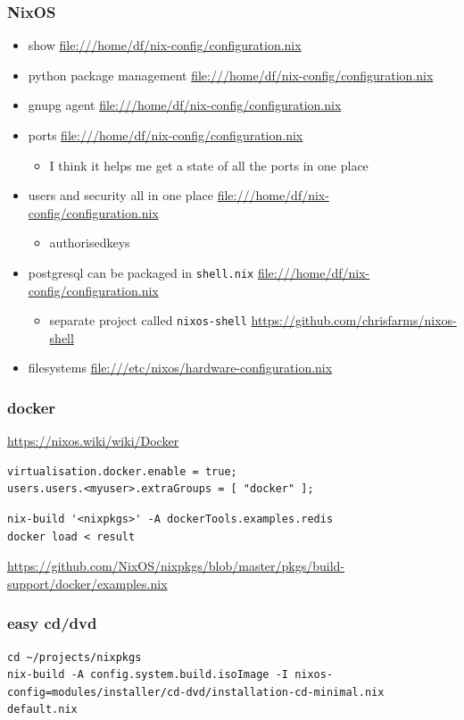 \documentclass[11pt]{article}
\begin{document}
\subsubsection{NixOS}
\label{sec:org1cc133c}
\begin{itemize}
\item show \url{file:///home/df/nix-config/configuration.nix}
\item python package management \url{file:///home/df/nix-config/configuration.nix}
\item gnupg agent \url{file:///home/df/nix-config/configuration.nix}
\item ports \url{file:///home/df/nix-config/configuration.nix}
\begin{itemize}
\item I think it helps me get a state of all the ports in one place
\end{itemize}
\item users and security all in one place
\url{file:///home/df/nix-config/configuration.nix}
\begin{itemize}
\item authorisedkeys
\end{itemize}
\item postgresql can be packaged in \texttt{shell.nix}
\url{file:///home/df/nix-config/configuration.nix}
\begin{itemize}
\item separate project called \texttt{nixos-shell}
\url{https://github.com/chrisfarms/nixos-shell}
\end{itemize}
\item filesystems \url{file:///etc/nixos/hardware-configuration.nix}
\end{itemize}
\subsubsection{docker}
\label{sec:org945334f}
\url{https://nixos.wiki/wiki/Docker}
\begin{verbatim}
virtualisation.docker.enable = true;
users.users.<myuser>.extraGroups = [ "docker" ];
\end{verbatim}
\begin{verbatim}
nix-build '<nixpkgs>' -A dockerTools.examples.redis
docker load < result
\end{verbatim}
\url{https://github.com/NixOS/nixpkgs/blob/master/pkgs/build-support/docker/examples.nix}
\subsubsection{easy cd/dvd}
\label{sec:orga77d51e}
\begin{verbatim}
cd ~/projects/nixpkgs
nix-build -A config.system.build.isoImage -I nixos-config=modules/installer/cd-dvd/installation-cd-minimal.nix default.nix
\end{verbatim}
\end{document}
